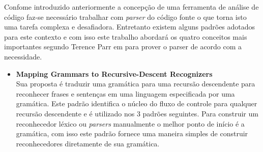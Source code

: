 Confome introduzido anteriormente a concepç\~{a}o de uma ferramenta de an\'{a}lise de c\'{o}digo faz-se necess\'{a}rio trabalhar com  \textit{parser} do c\'{o}digo fonte o que torna isto uma tarefa complexa e desafiadora. Entretanto existem alguns padr\~{o}es adotados para este contexto e com isso este trabalho abordar\'{a} os quatro conceitos  mais importantes segundo Terence Parr em \cite{Parr:2009:LIP:1823613} para prover o parser de acordo com a necessidade.
\begin{itemize}
	\item \textbf{Mapping Grammars to Recursive-Descent Recognizers}\\
	Sua proposta \'{e} traduzir uma gram\'{a}tica para uma recurs\~{a}o descendente para reconhecer frases e sentenças em uma linguagem especificada por uma gram\'{a}tica. Este padr\~{a}o identifica o n\'{u}cleo do fluxo de controle para qualquer recurs\~{a}o descendente e \'{e} utilizado nos 3 padr\~{o}es seguintes. 
	Para construir um reconhecedor l\'{e}xico ou \textit{parsers} manualmente o melhor ponto de in\'{i}cio \'{e} a gram\'{a}tica, com isso este padr\~{a}o fornece uma maneira simples de construir reconhecedores diretamente de sua gram\'{a}tica.
	

\end{itemize}
